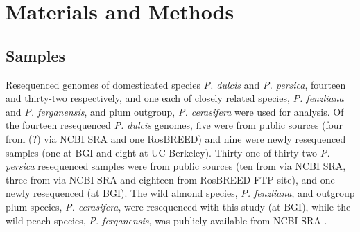 \documentclass[12pt]{article}
\begin{document}



\section*{Materials and Methods}
\subsection*{Samples}
Resequenced genomes of domesticated species \emph{P. dulcis} and \emph{P. persica}, fourteen and thirty-two respectively, and one each of closely related species, \emph{P. fenzliana} and \emph{P. ferganensis}, and plum outgroup, \emph{P. cerasifera} were used for analysis. 
%
Of the fourteen resequenced \emph{P. dulcis} genomes, five were from public sources (four from \citealt{koepke2013comparative}(?) via NCBI SRA and one RosBREED) and nine were newly resequenced samples (one at BGI and eight at UC Berkeley). 
%
Thirty-one of thirty-two \emph{P. persica} resequenced samples were from public sources (ten from \citealt{verde2013high} via NCBI SRA, three from \citealt{ahmad2011whole} via NCBI SRA and eighteen from RosBREED FTP site),
and one newly resequenced (at BGI). 
%
The wild almond species, \emph{P. fenzliana}, and outgroup plum species, \emph{P. cerasifera}, were resequenced with this study (at BGI), while the wild peach species, \emph{P. ferganensis}, was publicly available from NCBI SRA \citep{verde2013high}.\\
%
%
\end{document}
